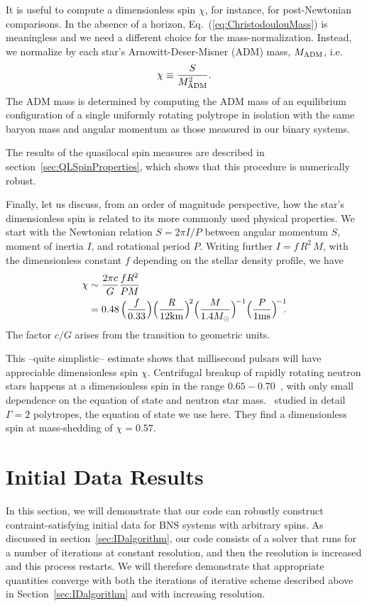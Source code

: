 It is useful to compute a dimensionless spin $\chi$, for instance, for
post-Newtonian comparisons. In the absence of a horizon,
Eq.~(\ref{eq:ChristodoulouMass}) is meaningless and we need a different
choice for the mass-normalization. Instead, we normalize by each 
star's Arnowitt-Deser-Misner (ADM) mass, $M_{\rm{ADM}}$, i.e. 
\begin{equation}
\chi\equiv \frac{S}{M_{\rm ADM}^2}.
\end{equation}
The ADM mass is determined by computing the ADM mass of an equilibrium configuration of a single uniformly rotating polytrope in isolation with the same baryon mass and angular momentum as those measured in our binary systems.


The results of the
quasilocal spin measures are described in
section~\ref{sec:QLSpinProperties}, which shows that this procedure is
numerically robust.

Finally, let us discuss, from an order of magnitude perspective, how
the star's dimensionless spin is related to its more commonly used physical properties.
We start with the Newtonian relation $S=2\pi I/P$ between angular
momentum $S$, moment of inertia $I$, and rotational period $P$.
Writing further $I=f\,R^2\,M$, with the dimensionless constant $f$
depending on the stellar density profile, we have 
\begin{align}
\chi&\sim\frac{2\pi c}{G}\frac{fR^2}{PM} \nonumber\\
&=
0.48\,\Big(\frac{f}{0.33}\Big)\Big(\frac{R}{12{\rm
    km}}\Big)^{\!2}\Big(\frac{M}{1.4M_{\odot}}\Big)^{\!-1}\Big(\frac{P}{1{\rm
    ms}}\Big)^{\!-1}\!\!.
\end{align}
The factor $c/G$ arises from the transition to geometric units. 

This --quite simplistic-- estimate shows that millisecond pulsars will
have appreciable dimensionless spin $\chi$. Centrifugal breakup of
rapidly rotating neutron stars happens at a dimensionless spin in the
range $0.65-0.70$~\citep{Lo:2010bj}, with only small dependence on the
equation of state and neutron star mass.~\cite{Ansorg:2003br} studied in detail $\Gamma = 2$ polytropes, the
equation of state we use here. They find a
dimensionless spin at mass-shedding of $\chi=0.57$.

\section{Initial Data Results}
\label{sec:ID}

In this section, we will demonstrate that our code can robustly
construct contraint-satisfying initial data for BNS systems with
arbitrary spins. As discussed in section~\ref{sec:IDalgorithm}, our code consists of a
solver that runs for a number of iterations at constant
resolution, and then the resolution is increased and this process
restarts. We will therefore demonstrate that appropriate quantities
converge with both the iterations of iterative scheme described above in
Section~\ref{sec:IDalgorithm} and with
increasing resolution.

